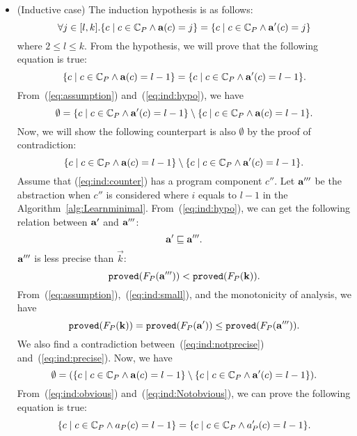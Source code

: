 \begin{itemize}
\item (Inductive case) 
The induction hypothesis is as follows:
\begin{equation}\label{eq:ind:hypo}
\forall j \in [l,k].\{c \mid c \in \mathbb{C}_P \land {\bf a}(c) = j\} = \{c \mid c \in \mathbb{C}_P \land {\bf a}'(c) = j\}
\end{equation}
where $2\le l\le k$.
From the hypothesis, we will prove that the following equation is true:
\begin{equation}\label{eq:ind:goal}
\{c \mid c \in \mathbb{C}_P \land {\bf a}(c) = l-1\} = \{c \mid c\in \mathbb{C}_P \land {\bf a}'(c) = l-1\}.
\end{equation}
From~(\ref{eq:assumption}) and~(\ref{eq:ind:hypo}), we have
\begin{equation}\label{eq:ind:obvious}
\emptyset = \{c \mid c\in \mathbb{C}_P \land {\bf a}'(c) = l-1\} \setminus \{c \mid c\in \mathbb{C}_P \land {\bf a}(c) = l-1\}.
\end{equation}
Now, we will show the following counterpart is also $\emptyset$ by the proof of contradiction:
\begin{equation}\label{eq:ind:counter}
\{c \mid c\in \mathbb{C}_P \land {\bf a}(c) = l-1\} \setminus \{c \mid c\in \mathbb{C}_P \land {\bf a}'(c) = l-1\}.
\end{equation}
Assume that (\ref{eq:ind:counter}) has a program component $c''$.
Let ${\bf a}'''$ be the abstraction when $c''$ is considered where $i$ equals to $l-1$ in the Algorithm~\ref{alg:Learnminimal}. From~(\ref{eq:ind:hypo}), we can get the following relation between ${\bf a}'$ and ${\bf a}'''$:
\begin{equation}\label{eq:ind:small}
{\bf a}'\sqsubseteq {\bf a}'''.
\end{equation}
${\bf a}'''$ is less precise than $\vec{k}$:
\begin{equation}\label{eq:ind:notprecise}
{\tt proved}(F_P({\bf a}'''))<{\tt proved}(F_P({\bf k})).
\end{equation}
From~(\ref{eq:assumption}),~(\ref{eq:ind:small}), and the monotonicity of analysis, we have
\begin{equation}\label{eq:ind:precise}
{\tt proved}(F_P({\bf k})) = {\tt proved}(F_P({\bf a}')) \le {\tt proved}(F_P({\bf a}''')).
\end{equation}
We also find a contradiction between~(\ref{eq:ind:notprecise}) and~(\ref{eq:ind:precise}).
Now, we have
\begin{equation}\label{eq:ind:Notobvious}
\emptyset = (\{c \mid c\in \mathbb{C}_P \land {\bf a}(c) = l-1\} \setminus \{c \mid c\in \mathbb{C}_P \land {\bf a}'(c) = l-1\}).
\end{equation}
From~(\ref{eq:ind:obvious}) and~(\ref{eq:ind:Notobvious}), we can prove the following equation is true:
\[
\{c \mid c\in \mathbb{C}_P \land a_P(c) = l-1\} = \{c \mid c\in \mathbb{C}_P \land a_P'(c) = l-1\}.
\]

\end{itemize}


